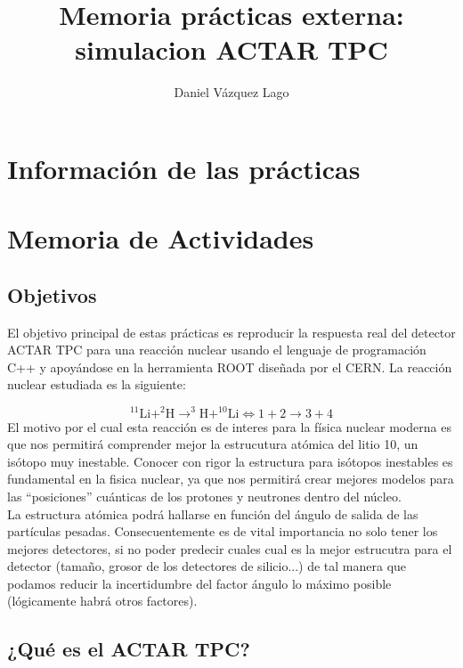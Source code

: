 \documentclass[12pt,a4paper]{article}
\title{Memoria prácticas externa: simulacion ACTAR TPC}
\author{Daniel Vázquez Lago}
\numberwithin{equation}{section}
\numberwithin{figure}{section}
\begin{document}
\maketitle

\newpage

\tableofcontents

\newpage

\section{Información de las prácticas}

\section{Memoria de Actividades}

\subsection{Objetivos}

El objetivo principal de estas prácticas es reproducir la respuesta real del detector ACTAR TPC para una reacción nuclear usando el lenguaje de programación C++ y apoyándose en la herramienta ROOT diseñada por el CERN. La reacción nuclear estudiada es la siguiente:

\begin{equation}
    ^{11}\mathrm{Li}+^2\mathrm{H} \rightarrow ^3\mathrm{H}+^{10}\mathrm{Li} \Longleftrightarrow 1 + 2 \rightarrow 3 + 4
\end{equation}
El motivo por el cual esta reacción es de interes para la física nuclear moderna es que nos permitirá comprender mejor la estrucutura atómica del litio 10, un isótopo muy inestable. Conocer con rigor la estructura para isótopos inestables es fundamental en la fisica nuclear, ya que nos permitirá crear mejores modelos para las ``posiciones'' cuánticas de los protones y neutrones dentro del núcleo. \\ 

La estructura atómica podrá hallarse en función del ángulo de salida de las partículas pesadas. Consecuentemente es de vital importancia no solo tener los mejores detectores, si no poder predecir cuales cual es la mejor estrucutra para el detector (tamaño, grosor de los detectores de silicio...) de tal manera que podamos reducir la incertidumbre del factor ángulo lo máximo posible (lógicamente habrá otros factores).

\subsection{¿Qué es el ACTAR TPC?}
\end{document}
